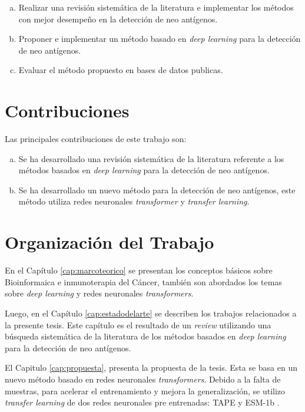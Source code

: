 \begin{enumerate}[(a)]
\item Realizar una revisión sistemática de la literatura e implementar los métodos con mejor desempeño en la detección de neo antígenos.
\item Proponer e implementar un método basado en \textit{deep learning} para la detección de neo antígenos.		
\item Evaluar el método propuesto en bases de datos publicas.
\end{enumerate}

\section{Contribuciones}
\label{sec:contribuciones}
Las principales contribuciones de este trabajo son:

\begin{enumerate}[(a)]
	\item Se ha desarrollado una revisión sistemática de la literatura referente a los métodos basados en \textit{deep learning} para la detección de neo antígenos.
	\item Se ha desarrollado un nuevo método para la detección de neo antígenos, este método utiliza redes neuronales \textit{transformer} y \textit{transfer learning}.
\end{enumerate}

\section{Organización del Trabajo}
\label{sec:organizaciondeltrabajo}
En el Capítulo \ref{cap:marcoteorico} se presentan los conceptos básicos sobre Bioinformaica e inmunoterapia del Cáncer, también son abordados los temas sobre \textit{deep learning} y redes neuronales \textit{transformers}.

Luego, en el Capítulo \ref{cap:estadodelarte} se describen los trabajos relacionados a la presente tesis. Este capítulo es el resultado de un \textit{review} utilizando una búsqueda sistemática de la literatura de los métodos basados en \textit{deep learning} para la detección de neo antígenos.

El Capitulo \ref{cap:propuesta}, presenta la propuesta de la tesis. Esta se basa en un nuevo método basado en redes neuronales \textit{transformers}. Debido a la falta de muestras, para acelerar el entrenamiento y mejora la generalización, se utilizo \textit{transfer learning} de dos redes neuronales pre entrenadas: TAPE \citep{rao2019evaluating} y ESM-1b \citep{rives2021biological}.

